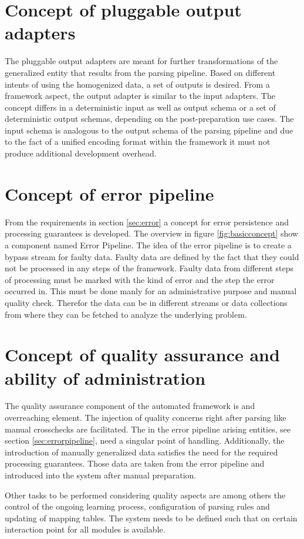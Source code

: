 \section{Concept of pluggable output adapters\label{sec:componentsoutput}}

The pluggable output adapters are meant for further transformations of the generalized entity that results from the parsing pipeline. Based on different intents of using the homogenized data, a set of outputs is desired. From a framework aspect, the output adapter is similar to the input adapters. The concept differs in a deterministic input as well as output schema or a set of deterministic output schemas, depending on the post-preparation use cases. The input schema is analogous to the output schema of the parsing pipeline and due to the fact of a unified encoding format within the framework it must not produce additional development overhead. 

\section{Concept of error pipeline \label{sec:errorpipeline}}

From the requirements in section \ref{sec:error} a concept for error persistence and processing guarantees is developed. The overview in figure \ref{fig:basicconcept} show a component named Error Pipeline. The idea of the error pipeline is to create a bypass stream for faulty data. Faulty data are defined by the fact that they could not be processed in any steps of the framework. Faulty data from different steps of processing must be marked with the kind of error and the step the error occurred in. This must be done manly for an administrative purpose and manual quality check. Therefor the data can be in different streams or data collections from where they can be fetched to analyze the underlying problem.

\section{Concept of quality assurance and ability of administration}

The quality assurance component of the automated framework is and overreaching element. The injection of quality concerns right after parsing like manual crosschecks are facilitated. The in the error pipeline arising entities, see section \ref{sec:errorpipeline}, need a singular point of handling. Additionally, the introduction of manually generalized data satisfies the need for the required processing guarantees. Those data are taken from the error pipeline and introduced into the system after manual preparation. 

Other tasks to be performed considering quality aspects are among others the control of the ongoing learning process, configuration of parsing rules and updating of mapping tables. The system needs to be defined such that on certain interaction point for all modules is available.